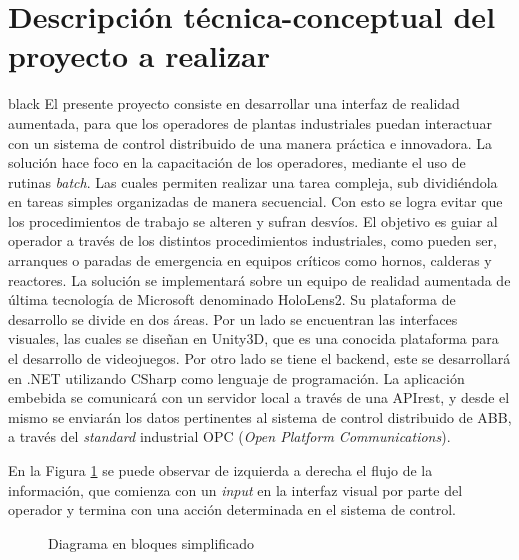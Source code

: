 \documentclass[11pt]{charter}
\begin{document}
\section{Descripción técnica-conceptual del proyecto a realizar}
\label{sec:descripcion}

\begin{consigna}{black}
El presente proyecto consiste en desarrollar una interfaz de realidad aumentada, para que los operadores de plantas industriales puedan interactuar con un sistema de control distribuido de una manera práctica e innovadora. La solución hace foco en la capacitación de los operadores, mediante el uso de rutinas \textit{batch}. Las cuales permiten realizar una tarea compleja, sub dividiéndola en tareas simples organizadas de manera secuencial. Con esto se logra evitar que los procedimientos de trabajo se alteren y sufran desvíos. El objetivo es guiar al operador a través de los distintos procedimientos industriales, como pueden ser, arranques o paradas de emergencia en equipos críticos como hornos, calderas y reactores. La solución se implementará sobre un equipo de realidad aumentada de última tecnología de Microsoft denominado HoloLens2. Su plataforma de desarrollo se divide en dos áreas. Por un lado se encuentran las interfaces visuales, las cuales se diseñan en Unity3D, que es una conocida plataforma para el desarrollo de videojuegos. Por otro lado se tiene el backend, este se desarrollará en .NET utilizando CSharp como lenguaje de programación. La aplicación embebida se comunicará con un servidor local a través de una APIrest, y desde el mismo se enviarán los datos pertinentes al sistema de control distribuido de ABB, a través del \textit{standard} industrial OPC (\textit{Open Platform Communications}).  

En la Figura \ref{fig:esquema_inicial} se puede observar de izquierda a derecha el flujo de la información, que comienza con un \textit{input} en la interfaz visual por parte del operador y termina con una acción determinada en el sistema de control.

\vspace{25px}

\begin{figure}[htpb]
    \centering
    \def\svgwidth{\columnwidth}
    \fontsize{8}{5}\selectfont
    
	\caption{Diagrama en bloques simplificado}
	\label{fig:esquema_inicial}
\end{figure}

\vspace{25px}

\end{consigna}
\end{document}
